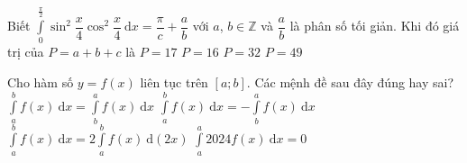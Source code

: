 \begin{ex}%
Biết $\displaystyle\int\limits_0^{\tfrac{\pi}{2}}\sin^2\dfrac{x}{4}{\cos^2}\dfrac{x}{4}\mathrm{~d}x=\dfrac{\pi}{c}+\dfrac{a}{b}$ với $a$, $b\in\mathbb{Z}$ và $\dfrac{a}{b}$ là phân số tối giản. Khi đó giá trị của $ P=a+b+c$ là
\choice
{$ P=17$}
{$ P=16$}
{$ P=32$}
{\True $ P=49$}
\end{ex}
\TNTF
\begin{ex}%
Cho hàm số $y=f(x)$ liên tục trên $\left[a;b\right]$. Các mệnh đề sau đây đúng hay sai?
\choiceTF
{$\displaystyle\int\limits_a^b{f(x)\mathrm{~d}x}=\displaystyle\int\limits_b^a{f(x)\mathrm{~d}x}$}
{\True $\displaystyle\int\limits_a^b{f(x)\mathrm{~d}x}=-\displaystyle\int\limits_b^a{f(x)\mathrm{~d}x}$}
{$\displaystyle\int\limits_a^bf(x)\mathrm{~d}x=2\displaystyle\int\limits_a^bf(x)\mathrm{~d}\left(2x\right)$}
{\True $\displaystyle\int\limits_a^a{2024f(x)\mathrm{~d}x=0}$}
\end{ex}
%
